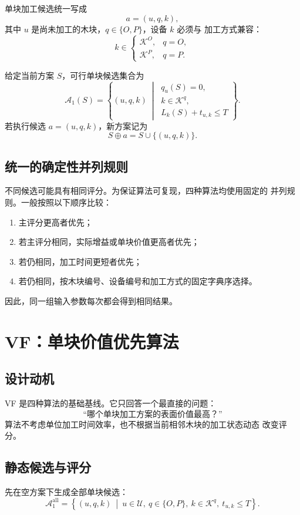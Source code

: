 \documentclass[UTF8,12pt,a4paper]{ctexart}
\newcommand{\Alg}[1]{\textsc{#1}}
\newcommand{\U}{\mathcal{U}}
\newcommand{\K}{\mathcal{K}}
\newcommand{\KO}{\mathcal{K}^{O}}
\newcommand{\KP}{\mathcal{K}^{P}}
\newcommand{\Aone}{\mathcal{A}_{1}}
\newcommand{\load}{L}
\begin{document}
单块加工候选统一写成
\[
a=(u,q,k),
\]
其中 \(u\) 是尚未加工的木块，\(q\in\{O,P\}\)，设备 \(k\) 必须与
加工方式兼容：
\[
k\in
\begin{cases}
\KO, & q=O,\\
\KP, & q=P.
\end{cases}
\]

给定当前方案 \(S\)，可行单块候选集合为
\[
\boxed{
\Aone(S)
=
\left\{
(u,q,k)
\ \middle|\
\begin{array}{l}
q_u(S)=0,\\
k\in\K^q,\\
\load_k(S)+t_{u,k}\leq T
\end{array}
\right\}
}.
\]
若执行候选 \(a=(u,q,k)\)，新方案记为
\[
S\oplus a=S\cup\{(u,q,k)\}.
\]

\subsection{统一的确定性并列规则}

不同候选可能具有相同评分。为保证算法可复现，四种算法均使用固定的
并列规则。一般按照以下顺序比较：
\begin{enumerate}
  \item 主评分更高者优先；
  \item 若主评分相同，实际增益或单块价值更高者优先；
  \item 若仍相同，加工时间更短者优先；
  \item 若仍相同，按木块编号、设备编号和加工方式的固定字典序选择。
\end{enumerate}
因此，同一组输入参数每次都会得到相同结果。

\section{\Alg{VF}：单块价值优先算法}

\subsection{设计动机}

\Alg{VF} 是四种算法的基础基线。它只回答一个最直接的问题：
\[
\text{“哪个单块加工方案的表面价值最高？”}
\]
算法不考虑单位加工时间效率，也不根据当前相邻木块的加工状态动态
改变评分。

\subsection{静态候选与评分}

先在空方案下生成全部单块候选：
\[
\Aone^{\mathrm{all}}
=
\left\{
(u,q,k)
\ \middle|\
u\in\U,\ q\in\{O,P\},\ k\in\K^q,\ t_{u,k}\leq T
\right\}.
\]
\end{document}
